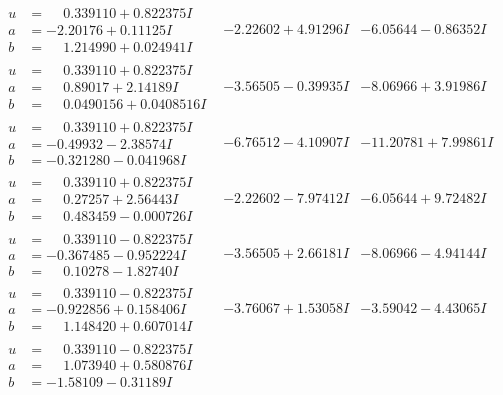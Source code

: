 \documentclass[1p]{elsarticle_modified}
\theoremstyle{definition}
\begin{document}
$$\begin{array}{c|c|c}
\begin{aligned}
u &= \phantom{-}0.339110 + 0.822375 I \\
a &= -2.20176 + 0.11125 I \\
b &= \phantom{-}1.214990 + 0.024941 I\end{aligned}
 & -2.22602 + 4.91296 I & -6.05644 - 0.86352 I \\ \hline\begin{aligned}
u &= \phantom{-}0.339110 + 0.822375 I \\
a &= \phantom{-}0.89017 + 2.14189 I \\
b &= \phantom{-}0.0490156 + 0.0408516 I\end{aligned}
 & -3.56505 - 0.39935 I & -8.06966 + 3.91986 I \\ \hline\begin{aligned}
u &= \phantom{-}0.339110 + 0.822375 I \\
a &= -0.49932 - 2.38574 I \\
b &= -0.321280 - 0.041968 I\end{aligned}
 & -6.76512 - 4.10907 I & -11.20781 + 7.99861 I \\ \hline\begin{aligned}
u &= \phantom{-}0.339110 + 0.822375 I \\
a &= \phantom{-}0.27257 + 2.56443 I \\
b &= \phantom{-}0.483459 - 0.000726 I\end{aligned}
 & -2.22602 - 7.97412 I & -6.05644 + 9.72482 I \\ \hline\begin{aligned}
u &= \phantom{-}0.339110 - 0.822375 I \\
a &= -0.367485 - 0.952224 I \\
b &= \phantom{-}0.10278 - 1.82740 I\end{aligned}
 & -3.56505 + 2.66181 I & -8.06966 - 4.94144 I \\ \hline\begin{aligned}
u &= \phantom{-}0.339110 - 0.822375 I \\
a &= -0.922856 + 0.158406 I \\
b &= \phantom{-}1.148420 + 0.607014 I\end{aligned}
 & -3.76067 + 1.53058 I & -3.59042 - 4.43065 I \\ \hline\begin{aligned}
u &= \phantom{-}0.339110 - 0.822375 I \\
a &= \phantom{-}1.073940 + 0.580876 I \\
b &= -1.58109 - 0.31189 I\end{aligned}

\end{array}$$
\end{document}
